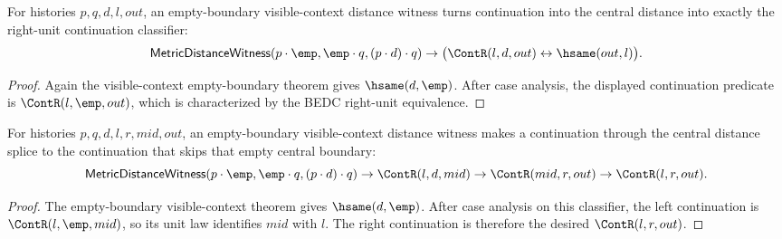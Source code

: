 \begin{theorem}
\label{thm:metric-empty-boundary-continuation-right-unit-iff}
For histories $p,q,d,l,out$, an empty-boundary visible-context distance witness
turns continuation into the central distance into exactly the right-unit
continuation classifier:
$$
\mathsf{MetricDistanceWitness}(p\cdot\emp,\emp\cdot q,(p\cdot d)\cdot q)
\to
\bigl(\ContR(l,d,out)\leftrightarrow\hsame(out,l)\bigr).
$$
\end{theorem}
\begin{proof}
Again the visible-context empty-boundary theorem gives $\hsame(d,\emp)$. After
case analysis, the displayed continuation predicate is $\ContR(l,\emp,out)$,
which is characterized by the BEDC right-unit equivalence.
\end{proof}

\begin{theorem}
\label{thm:metric-empty-boundary-continuation-splice}
For histories $p,q,d,l,r,mid,out$, an empty-boundary visible-context distance
witness makes a continuation through the central distance splice to the
continuation that skips that empty central boundary:
$$
\mathsf{MetricDistanceWitness}(p\cdot\emp,\emp\cdot q,(p\cdot d)\cdot q)
\to
\ContR(l,d,mid)\to
\ContR(mid,r,out)\to
\ContR(l,r,out).
$$
\end{theorem}
\begin{proof}
The empty-boundary visible-context theorem gives $\hsame(d,\emp)$. After case
analysis on this classifier, the left continuation is $\ContR(l,\emp,mid)$,
so its unit law identifies $mid$ with $l$. The right continuation is therefore
the desired $\ContR(l,r,out)$.
\end{proof}

